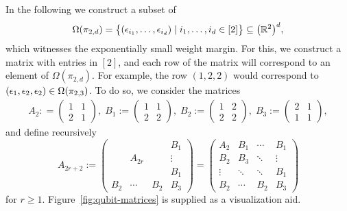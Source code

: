 In the following we construct a subset of
\begin{align*}
	\Omega(\pi_{2,d}) =  \big\lbrace (\epsilon_{i_1}, \ldots, \epsilon_{i_d}) \mid i_1, \ldots, i_d \in [2] \big\rbrace \subseteq \big( \mathbb R^2 \big)^d ,
\end{align*}
which witnesses the exponentially small weight margin. For this, we construct a matrix with entries in $[2]$, and each row of the matrix will correspond to an element of $\Omega(\pi_{2,d})$. For example, the row $(1,2,2)$ would correspond to $(\epsilon_1, \epsilon_2, \epsilon_2) \in \Omega(\pi_{2,3})$. To do so, we consider the matrices 
\begin{align*}
	A_2 : = \begin{pmatrix} 1 & 1 \\ 2 & 1 \end{pmatrix} , \;
	B_1 := \begin{pmatrix} 1 & 1 \\ 2 & 2 \end{pmatrix} , \;
	B_2 := \begin{pmatrix} 1 & 2 \\ 2 & 2 \end{pmatrix} , \;
	B_3 := \begin{pmatrix} 2 & 1 \\ 1 & 1 \end{pmatrix} ,
\end{align*}
and define recursively
\begin{equation}\label{eq:defA2r}
	A_{2r+2} := \begin{pmatrix}
		&  &  & B_1 \\ 
		&  A_{2r} &  & \vdots \\ 
		&  &  & B_1 \\ 
		B_2 & \cdots & B_2 & B_3
	\end{pmatrix} = 
	\begin{pmatrix}
		A_2 & B_1 & \cdots & B_1 \\ 
		B_2  & B_3 & \ddots & \vdots \\ 
		\vdots & \ddots & \ddots& B_1 \\ 
		B_2 & \cdots & B_2 & B_3
	\end{pmatrix}
\end{equation}
for $r \geq 1$. Figure~\ref{fig:qubit-matrices} is supplied as a visualization aid.

